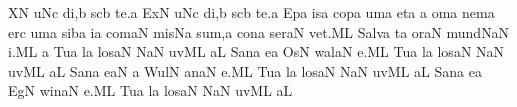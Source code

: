 \bigskip


\initiumgregorianum
{}%
\sgn {}{}X\punctum N\egn
{}u\pes Nc\egn
\sgn di,\punctum b\egn
\spatium
{}s\cephalicus cb\egn
\sgn te.\punctum a\egn
\spatium
\divisiofinalis
\spatium
\sgn {}Ex\chorus\punctum N\egn
{}u\pes Nc\egn
\sgn di,\engl{}\punctum b\egn
\spatium
{}s\cephalicus cb\egn
\sgn te.\punctum a\egn
\spatium
\divisiofinalis
\spatium
\sgn {}Ep\punctum a\egn
\sgn {}is\punctum a\egn
\sgn cop\punctum a\egn
\sgn {}um\punctum a\egn
\spatium
\sgn {}et\punctum a\egn
\spatium
\custos a
\lineaproxima
\sgn {}om\punctum a\egn
\sgn nem\punctum a\egn
\spatium
{}er\punctum c\egn
\sgn {}um\punctum a\egn
\spatium
\sgn sib\punctum a\egn
\sgn {}i{}\punctum a\egn
\spatium
\sgn com\cephalicus aN\egn
\sgn mis\pes Na\egn
\sgn su{m,}\punctum a\egn
\spatium
\sgn con\punctum a\egn
\sgn ser\cephalicus aN\egn
\sgn ve{t.}\engl{~}\clivis ML\egn
\spatium
\divisiofinalis
\spatium
\sgn Sa{lv}\punctum a\egn
{}t\punctum a\egn
\sgn {}or\clivis aN\egn
\spatium
\sgn m{u}{nd}\torculusdeminutus NaN\egn
\sgn {}i.\clivis ML\egn
\spatium
\divisiofinalis
\spatium
\custos a
\lineaproxima
\sgn Tu{}\chorus\punctum a\egn
\spatium
{}l\punctum a\egn
\sgn los\cephalicus aN\egn
\spatium
{}\torculusdeminutus NaN\egn
\sgn {}uv\clivis ML\egn
\sgn {}a{}\punctum L\egn
\spatium
\divisiofinalis
\spatium
\sgn S{a}n\cantores\punctum a\egn
{}e{}\punctum a\egn
\spatium
\sgn {}Os\punctum N\egn
\sgn wal\cephalicus aN\egn
{}e.\clivis ML\egn
\spatium
\divisiofinalis
\spatium
\sgn Tu{}\chorus\punctum a\egn
\spatium
{}l\punctum a\egn
\sgn los\cephalicus aN\egn
\spatium
{}\torculusdeminutus NaN\egn
\sgn {}uv\clivis ML\egn
\sgn {}a{}\punctum L\egn
\spatium
\divisiofinalis
\spatium
\sgn S{a}{n}\cantores\punctum a\egn
{}e{}\clivis aN\egn
\spatium
\custos a
\lineaproxima
\sgn Wul\punctum N\egn
{}an\cephalicus aN\egn
\sgn {}e.\clivis ML\egn
\spatium
\divisiofinalis
\spatium
\sgn Tu{}\chorus\punctum a\egn
\spatium
{}l\punctum a\egn
\sgn los\cephalicus aN\egn
\spatium
{}\torculusdeminutus NaN\egn
\sgn {}uv\clivis ML\egn
\sgn {}a{}\punctum L\egn
\spatium
\divisiofinalis
\spatium
\sgn S{a}n\cantores\punctum a\egn
{}e{}\punctum a\egn
\spatium
\sgn {}Eg\punctum N\egn
\sgn win\cephalicus aN\egn
\sgn {}e.\clivis ML\egn
\spatium
\divisiofinalis
\spatium
\sgn Tu{}\chorus\punctum a\egn
\spatium
{}l\punctum a\egn
\sgn los\cephalicus aN\egn
\spatium
{}\torculusdeminutus NaN\egn
\sgn {}uv\clivis ML\egn
\sgn {}a{}\punctum L\egn
\spatium
\Finisgregoriana

